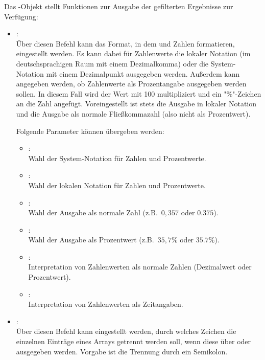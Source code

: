 Das -Objekt stellt Funktionen zur Ausgabe der gefilterten Ergebnisse zur Verfügung:

\begin{itemize}

\item
{}:\\
Über diesen Befehl kann das Format, in dem  und 
Zahlen formatieren, eingestellt werden. Es kann dabei für Zahlenwerte die lokaler Notation (im deutschsprachigen
Raum mit einem Dezimalkomma) oder die System-Notation mit einem Dezimalpunkt ausgegeben werden. Außerdem
kann angegeben werden, ob Zahlenwerte als Prozentangabe ausgegeben werden sollen. In diesem Fall wird
der Wert mit 100 multipliziert und ein "\%"-Zeichen an die Zahl angefügt. Voreingestellt ist stets die
Ausgabe in lokaler Notation und die Ausgabe als normale Fließkommazahl (also nicht als Prozentwert).

Folgende Parameter können  übergeben werden:
\begin{itemize}
\item
{}:\\
Wahl der System-Notation für Zahlen und Prozentwerte.
\item
{}:\\
Wahl der lokalen Notation für Zahlen und Prozentwerte.
\item
{}:\\
Wahl der Ausgabe als normale Zahl (z.B.\ $0{,}357$ oder $0.375$).
\item
{}:\\
Wahl der Ausgabe als Prozentwert (z.B.\ $35,7\%$ oder $35.7\%$).
\item
{}:\\
Interpretation von Zahlenwerten als normale Zahlen (Dezimalwert oder Prozentwert).
\item
{}:\\
Interpretation von Zahlenwerten als Zeitangaben.

\end{itemize}

\item
{}:\\
Über diesen Befehl kann eingestellt werden, durch welches Zeichen die einzelnen Einträge
eines Arrays getrennt werden soll, wenn diese über  oder
 ausgegeben werden.
Vorgabe ist die Trennung durch ein Semikolon.


\end{itemize}

